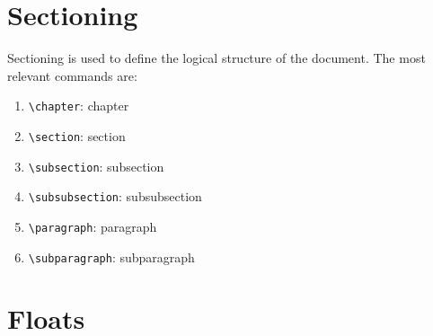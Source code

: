 \documentclass[11pt]{article}
\begin{document}
\section{Sectioning}
\label{sec:org3020630}
Sectioning is used to define the logical structure of the document. The most
relevant commands are:
\begin{enumerate}
\item \texttt{\textbackslash{}chapter}: chapter
\item \texttt{\textbackslash{}section}: section
\item \texttt{\textbackslash{}subsection}: subsection
\item \texttt{\textbackslash{}subsubsection}: subsubsection
\item \texttt{\textbackslash{}paragraph}: paragraph
\item \texttt{\textbackslash{}subparagraph}: subparagraph
\end{enumerate}

\section{Floats}
\label{sec:org97c1215}
\end{document}
